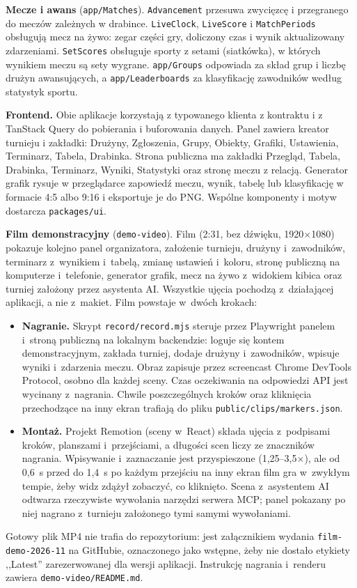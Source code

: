\documentclass[11pt,a4paper,oneside]{article}
\begin{document}
\textbf{Mecze i awans} (\texttt{app/Matches}). \texttt{Advancement} przesuwa zwycięzcę i przegranego do meczów zależnych w drabince. \texttt{LiveClock}, \texttt{LiveScore} i \texttt{MatchPeriods} obsługują mecz na żywo: zegar części gry, doliczony czas i wynik aktualizowany zdarzeniami. \texttt{SetScores} obsługuje sporty z setami (siatkówka), w których wynikiem meczu są sety wygrane. \texttt{app/Groups} odpowiada za skład grup i liczbę drużyn awansujących, a \texttt{app/Leaderboards} za klasyfikację zawodników według statystyk sportu.

\textbf{Frontend.} Obie aplikacje korzystają z typowanego klienta z kontraktu i z TanStack Query do pobierania i buforowania danych. Panel zawiera kreator turnieju i zakładki: Drużyny, Zgłoszenia, Grupy, Obiekty, Grafiki, Ustawienia, Terminarz, Tabela, Drabinka. Strona publiczna ma zakładki Przegląd, Tabela, Drabinka, Terminarz, Wyniki, Statystyki oraz stronę meczu z relacją. Generator grafik rysuje w przeglądarce zapowiedź meczu, wynik, tabelę lub klasyfikację w formacie 4:5 albo 9:16 i eksportuje je do PNG. Wspólne komponenty i motyw dostarcza \texttt{packages/ui}.

\textbf{Film demonstracyjny} (\texttt{demo-video}). Film (2:31, bez dźwięku, 1920$\times$1080) pokazuje kolejno panel organizatora, założenie turnieju, drużyny i~zawodników, terminarz z~wynikiem i~tabelą, zmianę ustawień i~koloru, stronę publiczną na komputerze i~telefonie, generator grafik, mecz na żywo z~widokiem kibica oraz turniej założony przez asystenta AI. Wszystkie ujęcia pochodzą z~działającej aplikacji, a nie z~makiet. Film powstaje w~dwóch krokach:
\begin{itemize}
\item \textbf{Nagranie.} Skrypt \texttt{record/record.mjs} steruje przez Playwright panelem i~stroną publiczną na lokalnym backendzie: loguje się kontem demonstracyjnym, zakłada turniej, dodaje drużyny i~zawodników, wpisuje wyniki i~zdarzenia meczu. Obraz zapisuje przez screencast Chrome DevTools Protocol, osobno dla każdej sceny. Czas oczekiwania na odpowiedzi API jest wycinany z~nagrania. Chwile poszczególnych kroków oraz kliknięcia przechodzące na inny ekran trafiają do pliku \texttt{public/clips/markers.json}.
\item \textbf{Montaż.} Projekt Remotion (sceny w~React) składa ujęcia z~podpisami kroków, planszami i~przejściami, a długości scen liczy ze znaczników nagrania. Wpisywanie i~zaznaczanie jest przyspieszone (1,25--3,5$\times$), ale od 0,6~s przed do 1,4~s po każdym przejściu na inny ekran film gra w~zwykłym tempie, żeby widz zdążył zobaczyć, co kliknięto. Scena z~asystentem AI odtwarza rzeczywiste wywołania narzędzi serwera MCP; panel pokazany po niej nagrano z~turnieju założonego tymi samymi wywołaniami.
\end{itemize}
Gotowy plik MP4 nie trafia do repozytorium: jest załącznikiem wydania \texttt{film-demo-2026-11} na GitHubie, oznaczonego jako wstępne, żeby nie dostało etykiety ,,Latest'' zarezerwowanej dla wersji aplikacji. Instrukcję nagrania i~renderu zawiera \texttt{demo-video/README.md}.
\end{document}
